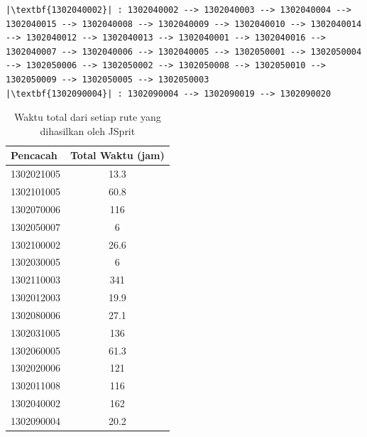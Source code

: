 \begin{listing}[!]
\begin{verbatim}
|\textbf{1302040002}| : 1302040002 --> 1302040003 --> 1302040004 --> 1302040015 --> 1302040008 --> 1302040009 --> 1302040010 --> 1302040014 --> 1302040012 --> 1302040013 --> 1302040001 --> 1302040016 --> 1302040007 --> 1302040006 --> 1302040005 --> 1302050001 --> 1302050004 --> 1302050006 --> 1302050002 --> 1302050008 --> 1302050010 --> 1302050009 --> 1302050005 --> 1302050003
|\textbf{1302090004}| : 1302090004 --> 1302090019 --> 1302090020
	\end{verbatim}
\end{listing}


\begin{table}[!]
	\centering
	\caption{Waktu total dari setiap rute yang dihasilkan oleh JSprit}
	\label{tbl:enumerators_total_time}
	\begin{tabular}{lc}
		\toprule
		Pencacah & Total Waktu (jam)\\
		\midrule
		1302021005 & 13.3\\
		1302101005 & 60.8\\
		1302070006 & 116\\
		1302050007 & 6\\
		1302100002 & 26.6\\
		1302030005 & 6\\
		1302110003 & 341\\
		1302012003 & 19.9\\
		1302080006 & 27.1\\
		1302031005 & 136\\
		1302060005 & 61.3\\
		1302020006 & 121\\
		1302011008 & 116\\
		1302040002 & 162\\
		1302090004 & 20.2\\
		\bottomrule
	\end{tabular}
\end{table}


